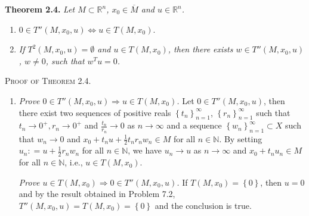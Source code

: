 \documentclass[a4paper]{article}
\numberwithin{equation}{section}
\begin{document}
\textbf{Theorem 2.4.} \textit{Let $M\subset \mathbb{R}^n$, $x_0 \in \overline{M}$ and $u\in \mathbb{R}^n$.}
\begin{enumerate}
\item $0 \in T''\left( {M,{x_0},u} \right) \Leftrightarrow u \in T\left( {M,{x_0}} \right)$.
\item \textit{If $T^2\left(M,x_0,u\right) =\emptyset$ and $u\in T\left(M,x_0\right)$, then there exists $w\in T''\left(M,x_0,u\right)$, $w\ne 0$, such that $w^Tu=0$.}
\end{enumerate}
\textsc{Proof of Theorem 2.4.} 
\begin{enumerate}
\item \textit{Prove $0 \in T''\left( {M,{x_0},u} \right) \Rightarrow u \in T\left( {M,{x_0}} \right)$.} Let $0\in T''\left(M,x_0,u\right)$, then there exist two sequences of positive reals $\left\{ {{t_n}} \right\}_{n = 1}^\infty $, $\left\{ {{r_n}} \right\}_{n = 1}^\infty $ such that $t_n\to 0^+,r_n\to 0^+$ and $\frac{t_n}{r_n}\to 0$ as $n\to \infty$ and a sequence $\left\{ {{w_n}} \right\}_{n = 1}^\infty  \subset X$ such that $w_n\to 0$ and $x_0+t_n u+\frac{1}{2}t_nr_nw_n\in M$ for all $n\in \mathbb{N}$. By setting ${u_n}: = u + \frac{1}{2}{r_n}{w_n}$ for all $n\in \mathbb{N}$, we have $u_n\to u$ as $n\to \infty$ and $x_0+t_n u_n\in M$ for all $n\in \mathbb{N}$, i.e., $u\in T\left(M,x_0\right)$.

\textit{Prove $u \in T\left( {M,{x_0}} \right) \Rightarrow 0 \in T''\left( {M,{x_0},u} \right)$.}  If $T\left( {M,{x_0}} \right) = \left\{ 0 \right\}$, then $u=0$ and by the result obtained in Problem 7.2, $T''\left( {M,{x_0},u} \right) = T\left( {M,{x_0}} \right) = \left\{ 0 \right\}$ and the conclusion is true. 


\end{enumerate}
\end{document}
